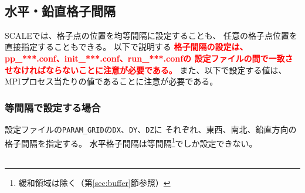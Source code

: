 \\



\subsection{水平・鉛直格子間隔}
\label{sec:gridinterv}
SCALEでは、格子点の位置を均等間隔に設定することも、
任意の格子点位置を直接指定することもできる。
以下で説明する
\textcolor{red}{\bf 格子間隔の設定は、pp\_***.conf、init\_***.conf、run\_***.confの
設定ファイルの間で一致させなければならないことに注意が必要である。}
また、以下で設定する値は、MPIプロセス当たりの値であることに注意が必要である。


\subsubsection{等間隔で設定する場合}
設定ファイルの\verb|PARAM_GRID|の\verb|DX|、\verb|DY|、\verb|DZ|に
それぞれ、東西、南北、鉛直方向の格子間隔を指定する。
水平格子間隔は等間隔\footnote{緩和領域は除く（第\ref{sec:buffer}節参照）}でしか設定できない。\\

\\


